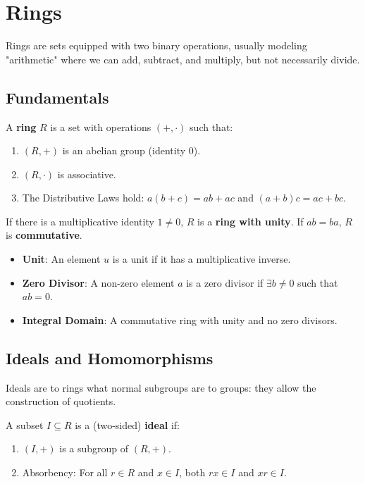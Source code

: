 \section{Rings}

Rings are sets equipped with two binary operations, usually modeling "arithmetic" where we can add, subtract, and multiply, but not necessarily divide.

\subsection{Fundamentals}

\begin{definition}[Ring]
A \textbf{ring} $R$ is a set with operations $(+, \cdot)$ such that:
\begin{enumerate}
    \item $(R, +)$ is an abelian group (identity $0$).
    \item $(R, \cdot)$ is associative.
    \item The Distributive Laws hold: $a(b+c) = ab + ac$ and $(a+b)c = ac + bc$.
\end{enumerate}
If there is a multiplicative identity $1 \neq 0$, $R$ is a \textbf{ring with unity}. If $ab=ba$, $R$ is \textbf{commutative}.
\end{definition}

\begin{definition}
\begin{itemize}
    \item \textbf{Unit}: An element $u$ is a unit if it has a multiplicative inverse.
    \item \textbf{Zero Divisor}: A non-zero element $a$ is a zero divisor if $\exists b \neq 0$ such that $ab=0$.
    \item \textbf{Integral Domain}: A commutative ring with unity and no zero divisors.
\end{itemize}
\end{definition}

\subsection{Ideals and Homomorphisms}

Ideals are to rings what normal subgroups are to groups: they allow the construction of quotients.

\begin{definition}[Ideal]
A subset $I \subseteq R$ is a (two-sided) \textbf{ideal} if:
\begin{enumerate}
    \item $(I, +)$ is a subgroup of $(R, +)$.
    \item Absorbency: For all $r \in R$ and $x \in I$, both $rx \in I$ and $xr \in I$.
\end{enumerate}
\end{definition}

